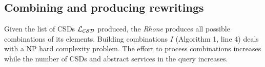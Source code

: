  

\subsection{Combining and producing rewritings}
Given the list of CSDs $\hbox{${\cal L_{CSD}}$}$ produced, the \textit{Rhone} produces all possible combinations of its elements. 
Building combinations $I$ (Algorithm 1, line 4) deals with a NP hard complexity problem.
The effort to process combinations increases while the number of CSDs and abstract services in the query increases.

